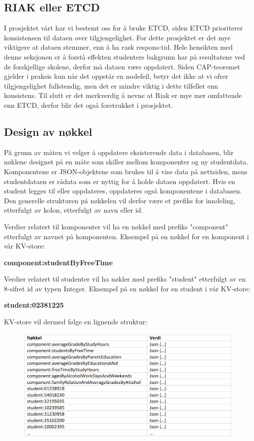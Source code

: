 \subsection{RIAK eller ETCD}
I prosjektet vårt har vi bestemt oss for å bruke ETCD, siden ETCD prioriterer konsistensen til dataen over tilgjengelighet. For dette prosjektet er det mye viktigere at dataen stemmer, enn å ha rask respons-tid. Hele hensikten med denne seksjonen er å forstå effekten studenters bakgrunn har på resultatene ved de forskjellige skolene, derfor må dataen være oppdatert. Siden CAP-teoremet gjelder i praksis kun når det oppstår en nodefeil, betyr det ikke at vi ofrer tilgjengelighet fullstendig, men det er mindre viktig i dette tilfellet enn konsistens. Til slutt er det merkverdig å nevne at Riak er mye mer omfattende enn ETCD, derfor blir det også foretrukket i prosjektet.

\subsection{Design av nøkkel}
På grunn av måten vi velger å oppdatere eksisterende data i databasen, blir nøklene designet på en måte som skiller mellom komponenter og ny studentdata. Komponentene er JSON-objektene som brukes til å vise data på nettsiden, mens studentdataen er rådata som er nyttig for å holde dataen oppdatert. Hvis en student legges til eller oppdateres, oppdateres også komponentene i databasen. Den generelle strukturen på nøkkelen vil derfor være et prefiks for inndeling, etterfulgt av kolon, etterfulgt av navn eller id.

Verdier relatert til komponenter vil ha en nøkkel med prefiks "component" etterfulgt av navnet på komponenten. Eksempel på en nøkkel for en komponent i vår KV-store:

  \textbf{component:studentByFreeTime}

Verdier relatert til studenter vil ha nøkler med prefiks "student" etterfulgt av en 8-sifret id av typen Integer. Eksempel på en nøkkel for en student i vår KV-store:

  \textbf{student:02381225}

KV-store vil dermed følge en lignende struktur:

\FigureCounter
\begin{figure}[H]
  \includegraphics[width=\textwidth]{images/milepael2/tabellKVStore.png}
\end{figure}

